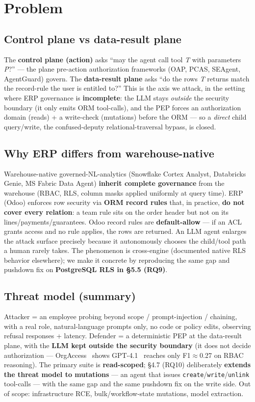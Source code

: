 \documentclass[runningheads]{llncs}
\newcommand{\code}[1]{\texttt{#1}}
\begin{document}
\section{Problem}

\subsection{Control plane vs data-result plane}
The \textbf{control plane (action)} asks ``may the agent call tool \emph{T} with parameters \emph{P}?'' --- the
plane pre-action authorization frameworks (OAP, PCAS, SEAgent, AgentGuard) govern. The \textbf{data-result
plane} asks ``do the rows \emph{T} returns match the record-rule the user is entitled to?'' This is the axis we
attack, in the setting where ERP governance is \textbf{incomplete}: the LLM stays \emph{outside} the security
boundary (it only emits ORM tool-calls), and the PEP forces an authorization domain (reads) + a write-check
(mutations) before the ORM --- so a \emph{direct} child query/write, the confused-deputy relational-traversal
bypass, is closed.


\subsection{Why ERP differs from warehouse-native}
Warehouse-native governed-NL-analytics (Snowflake Cortex Analyst, Databricks Genie, MS Fabric Data Agent)
\textbf{inherit complete governance} from the warehouse (RBAC, RLS, column masks applied uniformly at query
time). ERP (Odoo) enforces row security via \textbf{ORM record rules} that, in practice, \textbf{do not cover
every relation}: a team rule sits on the order header but not on its lines/payments/guarantees. Odoo record
rules are \textbf{default-allow} --- if an ACL grants access and no rule applies, the rows are returned. An LLM
agent enlarges the attack surface precisely because it autonomously chooses the child/tool path a human rarely
takes. The phenomenon is cross-engine (documented native RLS behavior elsewhere); we make it concrete by
reproducing the same gap and pushdown fix on \textbf{PostgreSQL RLS in \S5.5 (RQ9)}.

\subsection{Threat model (summary)}
Attacker = an employee probing beyond scope / prompt-injection / chaining, with a real role, natural-language
prompts only, no code or policy edits, observing refusal responses + latency. Defender = a deterministic PEP
at the data-result plane, with the \textbf{LLM kept outside the security boundary} (it does not decide
authorization --- OrgAccess~\cite{orgaccess} shows GPT-4.1~\cite{gpt41} reaches only F1$\approx$0.27 on RBAC reasoning). The primary suite is
\textbf{read-scoped}; \S4.7 (RQ10) deliberately \textbf{extends the threat model to mutations} --- an agent that
issues \code{create}/\code{write}/\code{unlink} tool-calls --- with the same gap and the same pushdown fix on the
write side. Out of scope: infrastructure RCE, bulk/workflow-state mutations, model extraction.
\end{document}

